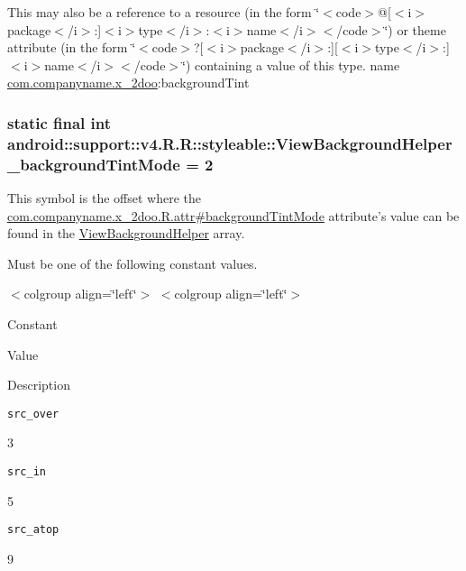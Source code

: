 This may also be a reference to a resource (in the form \char`\"{}$<$code$>$@\mbox{[}$<$i$>$package$<$/i$>$:\mbox{]}$<$i$>$type$<$/i$>$:$<$i$>$name$<$/i$>$$<$/code$>$\char`\"{}) or theme attribute (in the form \char`\"{}$<$code$>$?\mbox{[}$<$i$>$package$<$/i$>$:\mbox{]}\mbox{[}$<$i$>$type$<$/i$>$:\mbox{]}$<$i$>$name$<$/i$>$$<$/code$>$\char`\"{}) containing a value of this type.  name \hyperlink{namespacecom_1_1companyname_1_1x__2doo}{com.companyname.x\_\-2doo}:backgroundTint \hypertarget{classandroid_1_1support_1_1v4_1_1_r_1_1styleable_ce8b167b299fb0cf05509b92a60b8d04}{
\subsubsection[{ViewBackgroundHelper\_\-backgroundTintMode}]{\setlength{\rightskip}{0pt plus 5cm}static final int android::support::v4.R.R::styleable::ViewBackgroundHelper\_\-backgroundTintMode = 2}}
\label{classandroid_1_1support_1_1v4_1_1_r_1_1styleable_ce8b167b299fb0cf05509b92a60b8d04}


This symbol is the offset where the \hyperlink{classcom_1_1companyname_1_1x__2doo_1_1_r_1_1attr_506bd205bde05e75b64eae0de40e1b7b}{com.companyname.x\_\-2doo.R.attr\#backgroundTintMode} attribute's value can be found in the \hyperlink{classandroid_1_1support_1_1v4_1_1_r_1_1styleable_d2471e02511d7025f7168272065a760a}{ViewBackgroundHelper} array.

Must be one of the following constant values. \begin{TabularC}{0}
\hline
\end{TabularC}
$<$colgroup align=\char`\"{}left\char`\"{}$>$ $<$colgroup align=\char`\"{}left\char`\"{}$>$ 

Constant

Value

Description 

{\tt src\_\-over}

3

{\tt src\_\-in}

5

{\tt src\_\-atop}

9

